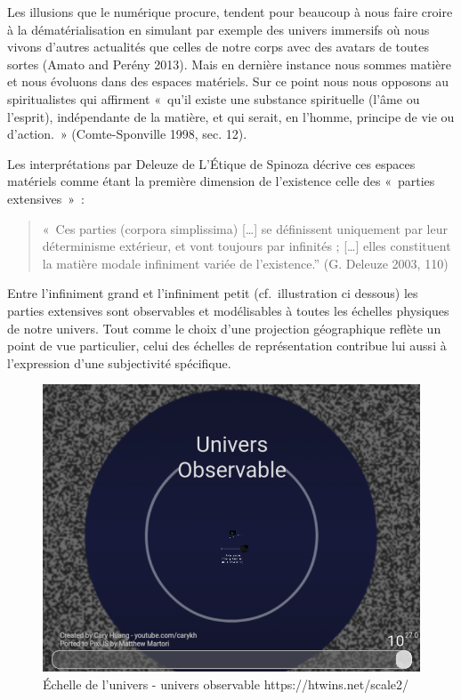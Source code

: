 \documentclass[
  letterpaper,
  DIV=11,
  numbers=noendperiod]{scrreprt}
\begin{document}
Les illusions que le numérique procure, tendent pour beaucoup à nous
faire croire à la dématérialisation en simulant par exemple des univers
immersifs où nous vivons d'autres actualités que celles de notre corps
avec des avatars de toutes sortes (Amato and Perény 2013). Mais en
dernière instance nous sommes matière et nous évoluons dans des espaces
matériels. Sur ce point nous nous opposons au spiritualistes qui
affirment «~qu'il existe une substance spirituelle (l'âme ou l'esprit),
indépendante de la matière, et qui serait, en l'homme, principe de vie
ou d'action.~» (Comte-Sponville 1998, sec. 12).

Les interprétations par Deleuze de L'Étique de Spinoza décrive ces
espaces matériels comme étant la première dimension de l'existence celle
des «~parties extensives~»~:

\begin{quote}
«~Ces parties (corpora simplissima) {[}\ldots{]} se définissent
uniquement par leur déterminisme extérieur, et vont toujours par
infinités ; {[}\ldots{]} elles constituent la matière modale infiniment
variée de l'existence.'' (G. Deleuze 2003, 110)
\end{quote}

Entre l'infiniment grand et l'infiniment petit (cf.~illustration ci
dessous) les parties extensives sont observables et modélisables à
toutes les échelles physiques de notre univers. Tout comme le choix
d'une projection géographique reflète un point de vue particulier, celui
des échelles de représentation contribue lui aussi à l'expression d'une
subjectivité spécifique.

\begin{figure}

{\centering \includegraphics{media/10000001000003080000024F28EEAE4E22F24B62.png}

}

\caption{\label{fig-echelleUnivers}Échelle de l'univers - univers
observable https://htwins.net/scale2/}

\end{figure}
\end{document}
